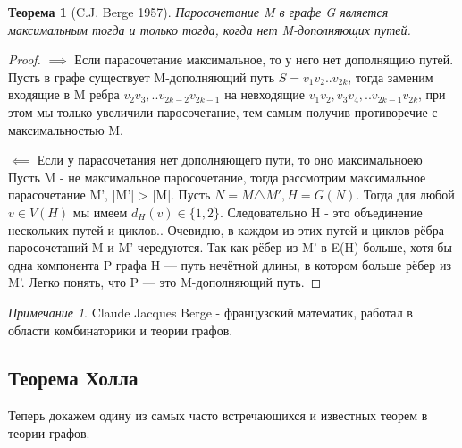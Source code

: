 \documentclass{article}
\newtheorem{theorem}{Теорема}
\theoremstyle{definition}
\theoremstyle{remark}
\newtheorem*{remark}{Примечание}
\begin{document}
\begin{theorem} [C.J. Berge 1957]
    Паросочетание M в графе G является максимальным тогда и только тогда, когда нет M-дополняющих
путей.
\end{theorem}
\begin{proof}

$\implies$ Если парасочетание максимальное, то у него нет дополнящию путей. 
Пусть в графе существует M-дополняющий путь $ S = v_1v_2..v_{2k}$,  тогда заменим входящие в M ребра $v_2v_3 , ..v_{2k-2}v_{2k-1}$ на невходящие $v_1v_2, v_3v_4, .. v_{2k-1
}v_{2k}$, при этом мы только увеличили паросочетание, тем самым получив противоречие с максимальностью M.


$\impliedby$ Если у парасочетания нет дополняющего пути, то оно максимальноею 
Пусть M - не максимальное паросочетание, тогда рассмотрим максимальное парасочетание M', |M'| > |M|. Пусть $N = M \triangle M', H = G(N)$. Тогда для любой $v \in V(H)$ мы имеем $d_H(v) \in \{1,2\}$. Следовательно H - это объединение нескольких путей и циклов.. Очевидно, в каждом
из этих путей и циклов рёбра паросочетаний M и M' чередуются. Так
как рёбер из M' в E(H) больше, хотя бы одна компонента P графа H — путь нечётной длины, в котором больше рёбер из M'. Легко понять, что P — это M-дополняющий путь.
\end{proof}

\begin{remark}
    Claude Jacques Berge - французский математик, работал в области комбинаторики и теории графов.
\end{remark}

\subsection{Теорема Холла}

Теперь докажем одину из самых часто встречающихся и известных теорем в теории графов.
\end{document}
